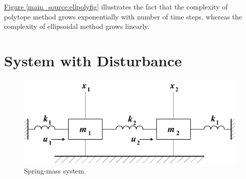 \documentclass[letterpaper,10pt,english]{sphinxmanual}
\begin{document}
\hyperref[main_source:ellpolyfig]{Figure  \ref*{main_source:ellpolyfig}} illustrates the fact that the complexity of polytope
method grows exponentially with number of time steps, whereas the
complexity of ellipsoidal method grows linearly.


\section{System with Disturbance}
\label{main_source:system-with-disturbance}\begin{figure}[htbp]
\centering
\capstart

\includegraphics{springmass.png}
\caption{Spring-mass system.}\label{main_source:springmassfig}\end{figure}
\end{document}
